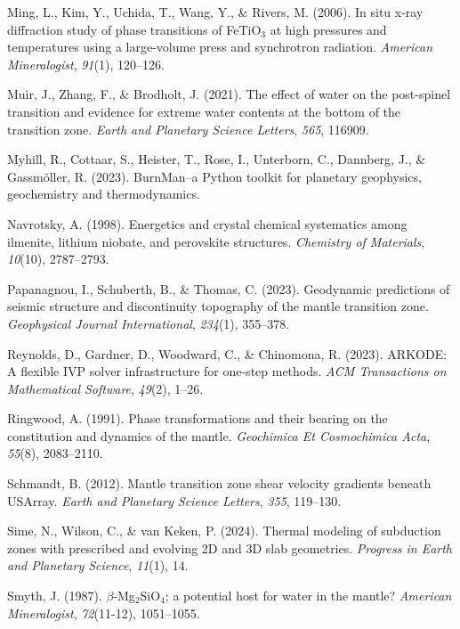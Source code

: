 \documentclass[draft,linenumbers]{agujournal2019}
\newlength{\cslhangindent}
\newenvironment{CSLReferences}[2]
 {\begin{list}{}{
  \setlength{\itemindent}{0pt}
  \setlength{\leftmargin}{0pt}
  \setlength{\parsep}{0pt}
  \ifodd #1
   \setlength{\leftmargin}{\cslhangindent}
   \setlength{\itemindent}{-\cslhangindent}
  \fi
  \setlength{\itemsep}{#2\baselineskip}
  }
  \item\relax}
 {\end{list}}
\begin{document}
\begin{CSLReferences}{1}{0}
Ming, L., Kim, Y., Uchida, T., Wang, Y., \& Rivers, M. (2006). In situ
x-ray diffraction study of phase transitions of {FeTiO\(_3\)} at high
pressures and temperatures using a large-volume press and synchrotron
radiation. \emph{American Mineralogist}, \emph{91}(1), 120--126.

Muir, J., Zhang, F., \& Brodholt, J. (2021). The effect of water on the
post-spinel transition and evidence for extreme water contents at the
bottom of the transition zone. \emph{Earth and Planetary Science
Letters}, \emph{565}, 116909.

Myhill, R., Cottaar, S., Heister, T., Rose, I., Unterborn, C., Dannberg,
J., \& Gassmöller, R. (2023). {BurnMan}--a {Python} toolkit for
planetary geophysics, geochemistry and thermodynamics.

Navrotsky, A. (1998). Energetics and crystal chemical systematics among
ilmenite, lithium niobate, and perovskite structures. \emph{Chemistry of
Materials}, \emph{10}(10), 2787--2793.

Papanagnou, I., Schuberth, B., \& Thomas, C. (2023). Geodynamic
predictions of seismic structure and discontinuity topography of the
mantle transition zone. \emph{Geophysical Journal International},
\emph{234}(1), 355--378.

Reynolds, D., Gardner, D., Woodward, C., \& Chinomona, R. (2023).
{ARKODE}: A flexible {IVP} solver infrastructure for one-step methods.
\emph{ACM Transactions on Mathematical Software}, \emph{49}(2), 1--26.

Ringwood, A. (1991). Phase transformations and their bearing on the
constitution and dynamics of the mantle. \emph{Geochimica Et
Cosmochimica Acta}, \emph{55}(8), 2083--2110.

Schmandt, B. (2012). Mantle transition zone shear velocity gradients
beneath {USArray}. \emph{Earth and Planetary Science Letters},
\emph{355}, 119--130.

{Sime, N., Wilson, C., \& van Keken, P.} (2024). Thermal modeling of
subduction zones with prescribed and evolving 2D and 3D slab geometries.
\emph{Progress in Earth and Planetary Science}, \emph{11}(1), 14.

Smyth, J. (1987). {\(\beta\)-Mg\(_2\)SiO\(_4\)}; a potential host for
water in the mantle? \emph{American Mineralogist}, \emph{72}(11-12),
1051--1055.


\end{CSLReferences}
\end{document}
